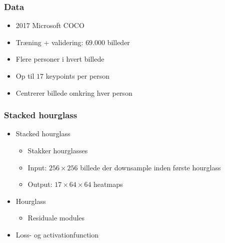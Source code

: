 \documentclass{beamer}
\begin{document}
\begin{frame}
    \frametitle{Data}
    \begin{minipage}{0.5\textwidth}
        \begin{itemize}
            \item 2017 Microsoft COCO
            \item Træning + validering: $69$.000 billeder
            \item Flere personer i hvert billede
            \item Op til $17$ keypoints per person
            \item Centrerer billede omkring hver person
        \end{itemize}
    \end{minipage}
    \begin{minipage}{0.45\textwidth}
    \end{minipage}
\end{frame}

\begin{frame}
    \frametitle{Stacked hourglass}
    \begin{minipage}{1\textwidth}
        \begin{itemize}
            \item<1-> Stacked hourglass
            \begin{itemize}
                \item Stakker hourglasses
                \item Input: $256 \times 256$ billede der downsample inden første hourglass
                \item Output: $17 \times 64 \times 64$ heatmaps
            \end{itemize}
            \item<2-> Hourglass
            \begin{itemize}
                \item Residuale modules
            \end{itemize}
            \item<3> Loss- og activationfunction
        \end{itemize}
    \end{minipage}
    \begin{minipage}{1\textwidth}
    \end{minipage}
\end{frame}
\end{document}
